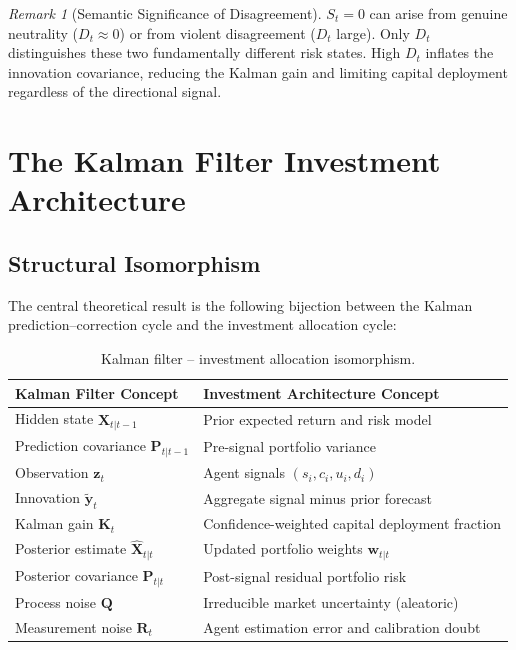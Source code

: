 \documentclass[12pt,openany]{book}
\numberwithin{equation}{chapter}
\theoremstyle{plain}
\theoremstyle{definition}
\theoremstyle{remark}
\newtheorem{remark}[theorem]{Remark}
\begin{document}
\begin{remark}[Semantic Significance of Disagreement]
$S_t = 0$ can arise from genuine neutrality ($D_t \approx 0$) or
from violent disagreement ($D_t$ large).  Only $D_t$ distinguishes
these two fundamentally different risk states.  High $D_t$ inflates
the innovation covariance, reducing the Kalman gain and limiting
capital deployment regardless of the directional signal.
\end{remark}

\chapter{The Kalman Filter Investment Architecture}
\label{ch:kalman}

\section{Structural Isomorphism}

The central theoretical result is the following bijection between
the Kalman prediction--correction cycle and the investment
allocation cycle:

\begin{table}[H]
\centering
\caption{Kalman filter -- investment allocation isomorphism.}
\label{tab:isomorphism}
\small
\begin{tabularx}{\textwidth}{@{} p{5.5cm} X @{}}
\toprule
\textbf{Kalman Filter Concept} & \textbf{Investment Architecture Concept} \\
\midrule
Hidden state $\hat{\mathbf{X}}_{t|t-1}$ & Prior expected return and risk model \\
Prediction covariance $\mathbf{P}_{t|t-1}$ & Pre-signal portfolio variance \\
Observation $\mathbf{z}_t$ & Agent signals $(s_i, c_i, u_i, d_i)$ \\
Innovation $\tilde{\mathbf{y}}_t$ & Aggregate signal minus prior forecast \\
Kalman gain $\mathbf{K}_t$ & Confidence-weighted capital deployment fraction \\
Posterior estimate $\hat{\mathbf{X}}_{t|t}$ & Updated portfolio weights $\mathbf{w}_{t|t}$ \\
Posterior covariance $\mathbf{P}_{t|t}$ & Post-signal residual portfolio risk \\
Process noise $\mathbf{Q}$ & Irreducible market uncertainty (aleatoric) \\
Measurement noise $\mathbf{R}_t$ & Agent estimation error and calibration doubt \\
\bottomrule
\end{tabularx}
\end{table}
\end{document}
